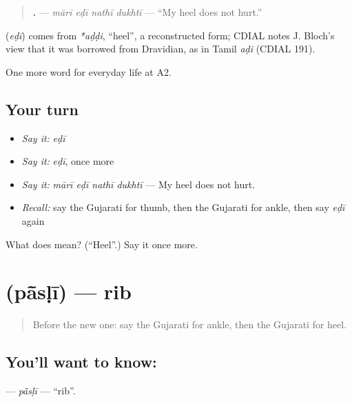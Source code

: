 \begin{quote}
\textbf{   .} — \emph{mārī eḍī nathī dukhtī} — \textquotedblleft{}My heel does not hurt.\textquotedblright{}
\end{quote}

\begin{cousinweb}
\textbf{} (\emph{eḍī}) comes from \emph{*aḍḍi}, \textquotedblleft{}heel\textquotedblright{}, a reconstructed form; CDIAL notes J. Bloch's view that it was borrowed from Dravidian, as in Tamil \emph{aḍi} (CDIAL 191).
\end{cousinweb}

\begin{grammarlens}[title={What you've built}]
One more word for everyday life at A2.
\end{grammarlens}

\subsection*{Your turn}
\begin{itemize}
\raggedright
  \item \emph{Say it:} \emph{eḍī}
  \item \emph{Say it:} \emph{eḍī}, once more
  \item \emph{Say it:} \emph{mārī eḍī nathī dukhtī} — My heel does not hurt.
  \item \emph{Recall:} say the Gujarati for thumb, then the Gujarati for ankle, then say \emph{eḍī} again
\end{itemize}

\begin{tcolorbox}[breakable,colback=teal!4,colframe=teal!35!black,title={Before you move on}]
What does  mean? (\textquotedblleft{}Heel\textquotedblright{}.) Say it once more.
\end{tcolorbox}
\section[\texorpdfstring{\gu{પાંસળી} (pā̃sḷī)}{પાંસળી (pā̃sḷī)}]{ (pā̃sḷī) — rib}

\label{lesson:GU-C229-pasli}



\begin{quote}
Before the new one: say the Gujarati for ankle, then the Gujarati for heel.
\end{quote}

\subsection*{You'll want to know: }
\textbf{} — \emph{pā̃sḷī} — \textquotedblleft{}rib\textquotedblright{}.

